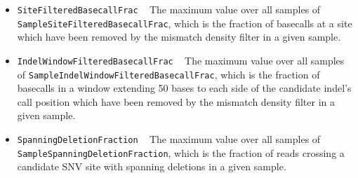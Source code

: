 \documentclass{article}
\begin{document}
\begin{itemize}
    \item \texttt{SiteFilteredBasecallFrac} ~ The maximum value over all samples of \texttt{SampleSiteFilteredBasecallFrac}, which is the fraction of basecalls at a site which have been removed by the mismatch density filter in a given sample.

    \item \texttt{IndelWindowFilteredBasecallFrac} ~ The maximum value over all samples of \texttt{SampleIndelWindowFilteredBasecallFrac}, which is the fraction of basecalls in a window extending 50 bases to each side of the candidate indel's call position which have been removed by the mismatch density filter in a given sample.

    \item \texttt{SpanningDeletionFraction} ~ The maximum value over all samples of \texttt{SampleSpanningDeletionFraction}, which is the fraction of reads crossing a candidate SNV site with spanning deletions in a given sample.
\end{itemize}



\end{document}
